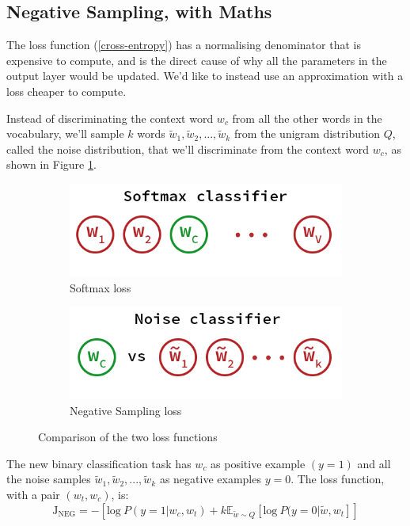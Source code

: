 \subsection{Negative Sampling, with Maths}
The loss function (\ref{cross-entropy}) has a normalising denominator that is expensive to compute, and is the direct cause of why all the parameters in the output layer would be updated. We'd like to instead use an approximation with a loss cheaper to compute.

Instead of discriminating the context word $w_c$ from all the other words in the vocabulary, we'll sample $k$ words $\tilde{w}_1, \tilde{w}_2, ..., \tilde{w}_k$ from the unigram distribution $Q$, called the noise distribution, that we'll discriminate from the context word $w_c$, as shown in Figure \ref{discri}.

\begin{figure}[H]
    \begin{subfigure}{.5\textwidth}
        \centering
        \includegraphics[width=0.9\linewidth]{Images/discri-softmax.png}
        \caption{Softmax loss}
    \end{subfigure}
    \begin{subfigure}{.5\textwidth}
        \centering
        \includegraphics[width=0.9\linewidth]{Images/discri-noise.png}
        \caption{Negative Sampling loss}
    \end{subfigure}
    \caption{Comparison of the two loss functions}
    \label{discri}
\end{figure}

The new binary classification task has $w_c$ as positive example $(y=1)$ and all the noise samples $\tilde{w}_1, \tilde{w}_2, ..., \tilde{w}_k$  as negative examples $y=0$. The loss function, with a pair $(w_t, w_c)$, is:
\begin{equation}
    \text{J}_{\text{NEG}}  = -[\text{log}~P(y=1| w_c, w_t) + k\mathbb{E}_{\tilde{w}\sim Q}[\text{log}~P(y=0|\tilde{w}, w_t]]
\end{equation}

